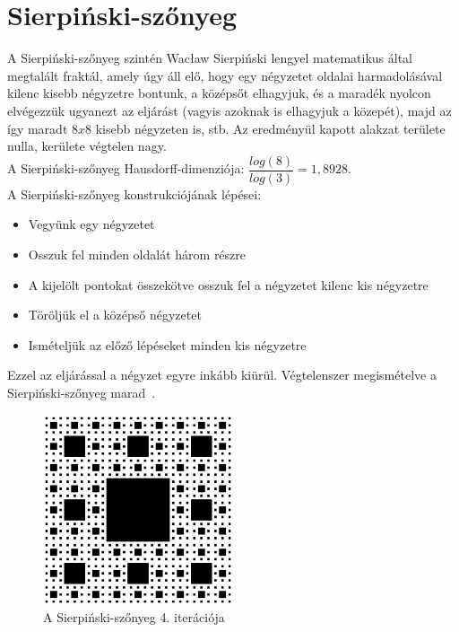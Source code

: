 \section{Sierpiński-szőnyeg}
A Sierpiński-szőnyeg szintén Wacław Sierpiński lengyel matematikus által megtalált fraktál, amely úgy áll elő, hogy egy négyzetet oldalai harmadolásával kilenc kisebb négyzetre bontunk, a középsőt elhagyjuk, és a maradék nyolcon elvégezzük ugyanezt az eljárást (vagyis azoknak is elhagyjuk a közepét), majd az így maradt $8x8$ kisebb négyzeten is, stb. Az eredményül kapott alakzat területe nulla, kerülete végtelen nagy.\\ 
A Sierpiński-szőnyeg Hausdorff-dimenziója: $\dfrac{log(8)}{log(3)} = 1,8928$.
\\A Sierpiński-szőnyeg konstrukciójának lépései:
\begin{itemize}
	\item Vegyünk egy négyzetet
	\item Osszuk fel minden oldalát három részre
	\item A kijelölt pontokat összekötve osszuk fel a négyzetet kilenc kis négyzetre
	\item Töröljük el a középső négyzetet
	\item Ismételjük az előző lépéseket minden kis négyzetre
\end{itemize}
Ezzel az eljárással a négyzet egyre inkább kiürül. Végtelenszer megismételve a Sierpiński-szőnyeg marad~\cite{sierp-carpet-wiki}.
\begin{figure}[!ht]
	\begin{center}
		\includegraphics[width=0.5\textwidth]{img/SierpinskiCarpet}
		\caption[labelInTOC]{A Sierpiński-szőnyeg 4. iterációja}
	\end{center}
\end{figure}

